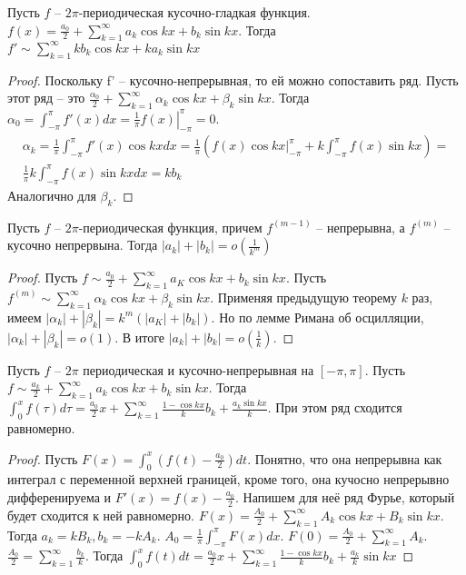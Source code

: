 \documentclass[document.tex]{subfiles}
\begin{document}
\begin{theorem}
    Пусть $f$ -- $2 \pi$-периодическая кусочно-гладкая функция. $f(x) = \frac{a_0}{2} + \sum_{k = 1}^{\infty} a_k \cos
    kx + b_k \sin kx$. Тогда $f' \sim  \sum_{k = 1}^{\infty} kb_k \cos kx + ka_k \sin kx$
\end{theorem}

\begin{proof}
    Поскольку f' -- кусочно-непрерывная, то ей можно сопоставить ряд. Пусть этот ряд -- это $\frac{\alpha_0}{2} +
    \sum_{k = 1}^{\infty} \alpha_k \cos kx + \beta_k \sin kx$. Тогда $\alpha_0 = \int_{-\pi}^{\pi}f'(x)dx = \left.
    \frac{1}{\pi}f(x) \right|_{-\pi}^{\pi} = 0$.
    \begin{multline*}
        \alpha_k = \frac{1}{\pi} \int_{-\pi}^{\pi}f'(x) \cos kx dx = \frac{1}{\pi} (f(x) \cos kx \left.
        \right|_{-\pi}^{\pi} + k \int_{-\pi}^{\pi}f(x) \sin kx) = \\
        \frac{1}{\pi} k \int_{-\pi}^{\pi}f(x) \sin kx dx = k
        b_k
    \end{multline*}
    Аналогично для $\beta_k$.
\end{proof}

\begin{definition}
    Пусть $f$ -- $2 \pi$-периодическая функция, причем $f^{(m - 1)}$ -- непрерывна, а $f^{(m)}$ -- кусочно непрервына.
    Тогда $|a_k| + |b_k| = o(\frac{1}{k^m})$
\end{definition}

\begin{proof}
    Пусть $f \sim \frac{a_0}{2} + \sum_{k = 1}^{\infty} a_K \cos kx + b_k \sin kx$. Пусть $f^{(m)} \sim \sum_{k =
    1}^{\infty} \alpha_k \cos kx + \beta_k \sin kx$. Применяя предыдущую теорему $k$ раз, имеем $|\alpha_k| + |\beta_k|
    = k^m(|a_K| + |b_k|)$. Но по лемме Римана об осцилляции, $|\alpha_k| + |\beta_k| = o(1)$. В итоге $|a_k| + |b_k| =
    o(\frac{1}{k})$.
\end{proof}

\begin{theorem}
    Пусть $f$ -- $2 \pi$ периодическая и кусочно-непрерывная на $[-\pi, \pi]$. Пусть $f \sim \frac{a_k}{2} + \sum_{k =
    1}^{\infty} a_k \cos kx + b_k \sin kx$. Тогда $\int_{0}^{x}f(\tau)d\tau = \frac{a_0}{2}x + \sum_{k = 1}^{\infty}
    \frac{1 - \cos kx}{k}b_k + \frac{a_k \sin kx}{k}$. При этом ряд сходится равномерно.
\end{theorem}

\begin{proof}
    Пусть $F(x) = \int_{0}^{x}(f(t) - \frac{a_0}{2})dt$. Понятно, что она непрерывна как интеграл с переменной верхней
    границей, кроме того, она кучосно непрерывно дифференируема и $F'(x) = f(x) - \frac{a_0}{2}$. Напишем для неё ряд
    Фурье, который будет сходится к ней равномерно. $F(x) = \frac{A_0}{2} + \sum_{k = 1}^{\infty} A_k \cos kx + B_k \sin
    kx$. Тогда $a_k = k B_k, b_k = -kA_k$. $A_0 = \frac{1}{\pi}\int_{-\pi}^{\pi}F(x)dx$. $F(0) = \frac{A_0}{2} + \sum_{k
    = 1}^{\infty}A_k$. $\frac{A_0}{2} = \sum_{k = 1}^{\infty}\frac{b_k}{k}$. Тогда $\int_{0}^{x}f(t)dt =
    \frac{a_0}{2}x + \sum_{k = 1}^{\infty}\frac{1 - \cos kx}{k}b_k + \frac{a_k}{k} \sin kx$
\end{proof}
\end{document}
